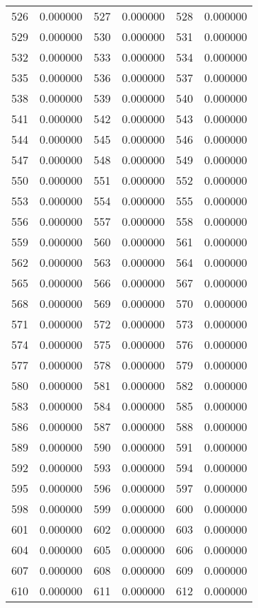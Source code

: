 \documentclass[12pt]{article}
\begin{document}
\begin{longtable}{@{}cc|cc|cc@{}}
526 & 0.000000 & 527 & 0.000000 & 528 & 0.000000 \\
529 & 0.000000 & 530 & 0.000000 & 531 & 0.000000 \\
532 & 0.000000 & 533 & 0.000000 & 534 & 0.000000 \\
535 & 0.000000 & 536 & 0.000000 & 537 & 0.000000 \\
538 & 0.000000 & 539 & 0.000000 & 540 & 0.000000 \\
541 & 0.000000 & 542 & 0.000000 & 543 & 0.000000 \\
544 & 0.000000 & 545 & 0.000000 & 546 & 0.000000 \\
547 & 0.000000 & 548 & 0.000000 & 549 & 0.000000 \\
550 & 0.000000 & 551 & 0.000000 & 552 & 0.000000 \\
553 & 0.000000 & 554 & 0.000000 & 555 & 0.000000 \\
556 & 0.000000 & 557 & 0.000000 & 558 & 0.000000 \\
559 & 0.000000 & 560 & 0.000000 & 561 & 0.000000 \\
562 & 0.000000 & 563 & 0.000000 & 564 & 0.000000 \\
565 & 0.000000 & 566 & 0.000000 & 567 & 0.000000 \\
568 & 0.000000 & 569 & 0.000000 & 570 & 0.000000 \\
571 & 0.000000 & 572 & 0.000000 & 573 & 0.000000 \\
574 & 0.000000 & 575 & 0.000000 & 576 & 0.000000 \\
577 & 0.000000 & 578 & 0.000000 & 579 & 0.000000 \\
580 & 0.000000 & 581 & 0.000000 & 582 & 0.000000 \\
583 & 0.000000 & 584 & 0.000000 & 585 & 0.000000 \\
586 & 0.000000 & 587 & 0.000000 & 588 & 0.000000 \\
589 & 0.000000 & 590 & 0.000000 & 591 & 0.000000 \\
592 & 0.000000 & 593 & 0.000000 & 594 & 0.000000 \\
595 & 0.000000 & 596 & 0.000000 & 597 & 0.000000 \\
598 & 0.000000 & 599 & 0.000000 & 600 & 0.000000 \\
601 & 0.000000 & 602 & 0.000000 & 603 & 0.000000 \\
604 & 0.000000 & 605 & 0.000000 & 606 & 0.000000 \\
607 & 0.000000 & 608 & 0.000000 & 609 & 0.000000 \\
610 & 0.000000 & 611 & 0.000000 & 612 & 0.000000 \\

\end{longtable}
\end{document}
